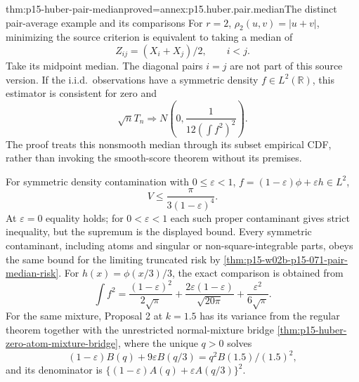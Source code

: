 \begin{hbtheorem}{thm:p15-huber-pair-median}{proved=annex:p15.huber.pair.median}{The distinct pair-average example and its comparisons}
For \(r=2\), \(\rho_2(u,v)=|u+v|\), minimizing the source criterion
is equivalent to taking a median of
\[
                  Z_{ij}=(X_i+X_j)/2,\qquad i<j.
\]
Take its midpoint median. The diagonal pairs \(i=j\) are not part
of this source version. If the i.i.d.\ observations have a symmetric
density \(f\in L^2(\mathbb R)\), this estimator is consistent
for zero and
\[
 \sqrt nT_n\Longrightarrow
          N\left(0,\frac1{12(\int f^2)^2}\right).
\]
The proof treats this nonsmooth median through its subset empirical
CDF, rather than invoking the smooth-score theorem without its premises.

For symmetric density contamination with \(0\leq\varepsilon<1\),
\(f=(1-\varepsilon)\phi+\varepsilon h\in L^2\),
\[
 V\leq\frac{\pi}{3(1-\varepsilon)^4}.
\]
At \(\varepsilon=0\) equality holds; for \(0<\varepsilon<1\)
each such proper contaminant gives strict inequality, but the
supremum is the displayed bound.
Every symmetric contaminant, including atoms and singular or
non-square-integrable parts, obeys the same bound for the limiting
truncated risk by \cref{thm:p15-w02b-p15-071-pair-median-risk}.
For \(h(x)=\phi(x/3)/3\), the exact comparison is obtained from
\[
 \int f^2=
 \frac{(1-\varepsilon)^2}{2\sqrt\pi}
 +\frac{2\varepsilon(1-\varepsilon)}{\sqrt{20\pi}}
 +\frac{\varepsilon^2}{6\sqrt\pi}.
\]
For the same mixture, Proposal 2 at \(k=1.5\) has its variance
from the regular theorem together with the unrestricted
normal-mixture bridge \cref{thm:p15-huber-zero-atom-mixture-bridge},
where the unique \(q>0\)
solves
\[
 (1-\varepsilon)B(q)+9\varepsilon B(q/3)
                 =q^2B(1.5)/(1.5)^2,
\]
and its denominator is
\(\{(1-\varepsilon)A(q)+\varepsilon A(q/3)\}^2\).
\end{hbtheorem}

